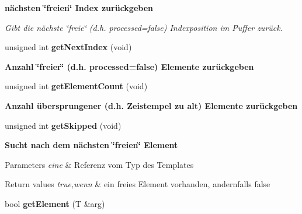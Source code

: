 \begin{Indent}{\bf nächsten \char`\"{}freien\char`\"{} Index zurückgeben}\par
{\em Gibt die nächste \char`\"{}freie\char`\"{} (d.\+h. processed=false) Indexposition im Puffer zurück. }\begin{DoxyCompactItemize}
\item 
\hypertarget{classrc_1_1CircularBuffer_a07d170b88c762967442b90ef2a4848fa}{unsigned int {\bfseries get\+Next\+Index} (void)}\label{classrc_1_1CircularBuffer_a07d170b88c762967442b90ef2a4848fa}

\end{DoxyCompactItemize}
\end{Indent}
\begin{Indent}{\bf Anzahl \char`\"{}freier\char`\"{} (d.\+h. processed=false) Elemente zurückgeben}\par
\begin{DoxyCompactItemize}
\item 
\hypertarget{classrc_1_1CircularBuffer_a1bb2a9a349df4e9b8e213434725c8b8f}{unsigned int {\bfseries get\+Element\+Count} (void)}\label{classrc_1_1CircularBuffer_a1bb2a9a349df4e9b8e213434725c8b8f}

\end{DoxyCompactItemize}
\end{Indent}
\begin{Indent}{\bf Anzahl übersprungener (d.\+h. Zeistempel zu alt) Elemente zurückgeben}\par
\begin{DoxyCompactItemize}
\item 
\hypertarget{classrc_1_1CircularBuffer_adb2c87f7037e86b5ca175645d3ba9a33}{unsigned int {\bfseries get\+Skipped} (void)}\label{classrc_1_1CircularBuffer_adb2c87f7037e86b5ca175645d3ba9a33}

\end{DoxyCompactItemize}
\end{Indent}
\begin{Indent}{\bf Sucht nach dem nächsten \char`\"{}freien\char`\"{} Element}\par
{\em 
\begin{DoxyParams}{Parameters}
{\em eine} & Referenz vom Typ des Templates \\
\hline
\end{DoxyParams}

\begin{DoxyRetVals}{Return values}
{\em true,wenn} & ein freies Element vorhanden, andernfalls false \\
\hline
\end{DoxyRetVals}
}\begin{DoxyCompactItemize}
\item 
\hypertarget{classrc_1_1CircularBuffer_a4ef798c56ada44df67cc4bb5ae1a08eb}{bool {\bfseries get\+Element} (T \&arg)}\label{classrc_1_1CircularBuffer_a4ef798c56ada44df67cc4bb5ae1a08eb}

\end{DoxyCompactItemize}
\end{Indent}
